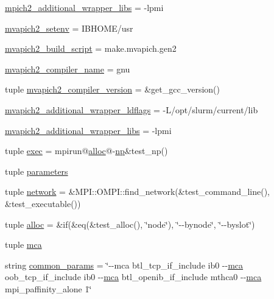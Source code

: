 \begin{DoxyCompactItemize}
\item 
\hyperlink{namespaceompi-core-perf-testing_af773f6fadd7d590602ecd2dd9b5ab051}{mpich2\-\_\-additional\-\_\-wrapper\-\_\-libs} = -\/lpmi
\item 
\hyperlink{namespaceompi-core-perf-testing_a68002d4d6e6a04e05980c8b2ae5b545e}{mvapich2\-\_\-setenv} = I\-B\-H\-O\-M\-E/usr
\item 
\hyperlink{namespaceompi-core-perf-testing_abfff00b4161e96bde810f9663393d72b}{mvapich2\-\_\-build\-\_\-script} = make.\-mvapich.\-gen2
\item 
\hyperlink{namespaceompi-core-perf-testing_aeed3a0308c22144a5231f51e5f1f1e01}{mvapich2\-\_\-compiler\-\_\-name} = gnu
\item 
tuple \hyperlink{namespaceompi-core-perf-testing_ab1de3bdc144731e9639d76187ffa8078}{mvapich2\-\_\-compiler\-\_\-version} = \&get\-\_\-gcc\-\_\-version()
\item 
\hyperlink{namespaceompi-core-perf-testing_a2fa43ea204acc1dcec3c162a8df26ddf}{mvapich2\-\_\-additional\-\_\-wrapper\-\_\-ldflags} = -\/L/opt/slurm/current/lib
\item 
\hyperlink{namespaceompi-core-perf-testing_a43fca8dff7f5401c4331cc8c4ce990e8}{mvapich2\-\_\-additional\-\_\-wrapper\-\_\-libs} = -\/lpmi
\item 
tuple \hyperlink{namespaceompi-core-perf-testing_af852fdd97d7de2e0bce32ec64104df81}{exec} = mpirun@\hyperlink{namespaceompi-core-perf-testing_aa210dffd33a5cf9389d7f932dc991a52}{alloc}@-\/\hyperlink{namespaceompi-core-perf-testing_a8703829fbfbe8a6c19e70d34f880b39e}{np}\&test\-\_\-np()
\item 
tuple \hyperlink{namespaceompi-core-perf-testing_a8b296a0041782bf28f9debd480c136cc}{parameters}
\item 
tuple \hyperlink{namespaceompi-core-perf-testing_aba864d853cd3697f3a66573fef630d72}{network} = \&M\-P\-I\-::\-O\-M\-P\-I\-::find\-\_\-network(\&test\-\_\-command\-\_\-line(), \&test\-\_\-executable())
\item 
tuple \hyperlink{namespaceompi-core-perf-testing_aa210dffd33a5cf9389d7f932dc991a52}{alloc} = \&if(\&eq(\&test\-\_\-alloc(), \char`\"{}node\char`\"{}), \char`\"{}-\/-\/bynode\char`\"{}, \char`\"{}-\/-\/byslot\char`\"{})
\item 
tuple \hyperlink{namespaceompi-core-perf-testing_a3057dee49d2981bae3a0bc69987f7b43}{mca}
\item 
string \hyperlink{namespaceompi-core-perf-testing_a00f59b40a472bd6d479927e1bce80827}{common\-\_\-params} = \char`\"{}-\/-\/mca btl\-\_\-tcp\-\_\-if\-\_\-include ib0 -\/-\/\hyperlink{namespaceompi-core-perf-testing_a3057dee49d2981bae3a0bc69987f7b43}{mca} oob\-\_\-tcp\-\_\-if\-\_\-include ib0 -\/-\/\hyperlink{namespaceompi-core-perf-testing_a3057dee49d2981bae3a0bc69987f7b43}{mca} btl\-\_\-openib\-\_\-if\-\_\-include mthca0 -\/-\/\hyperlink{namespaceompi-core-perf-testing_a3057dee49d2981bae3a0bc69987f7b43}{mca} mpi\-\_\-paffinity\-\_\-alone 1\char`\"{}

\end{DoxyCompactItemize}
